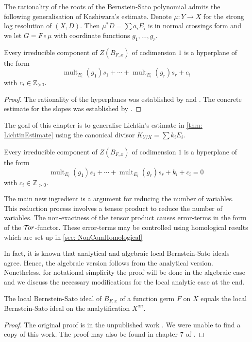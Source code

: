 The rationality of the roots of the Bernstein-Sato polynomial admits the following generalisation of Kashiwara's estimate.
Denote $\mu:Y\to X$ for the strong log resolution of $(X,D)$.
Then $\mu^*D = \sum a_i E_i$ is in normal crossings form and we let $G = F\circ \mu$ with coordinate functions $g_1,\ldots, g_r$.
\begin{theorem}\label{thm: Slopes}
  Every irreducible component of $Z(B_{F,x})$ of codimension $1$ is a hyperplane of the form
  $$\operatorname{mult}_{E_i}(g_1) s_1 + \cdots + \operatorname{mult}_{E_i}(g_r)s_r + c_i $$
  with $c_i\in \mathbb{Z}_{>0}.$
\end{theorem}
\begin{proof}
  The rationality of the hyperplanes was established by \cite{sabbah1987proximite} and \cite{gyoja1993bernstein}.
  The concrete estimate for the slopes was established by \cite{budur2019zero}.
\end{proof}

The goal of this chapter is to generalise Lichtin's estimate in \cref{thm: LichtinEstimate} using the canonical divisor $K_{Y/X} = \sum k_i E_i$.
\begin{theorem}\label{thm: EstimateBernsteinSatoZeroLocust}
  Every irreducible component of $Z(B_{F,x})$ of codimension $1$ is a hyperplane of the form
  $$\operatorname{mult}_{E_i}(g_1) s_1 + \cdots + \operatorname{mult}_{E_i}(g_r)s_r + k_i + c_i=0$$
  with $c_i \in \mathbb{Z}_{> 0 }$.
\end{theorem}
The main new ingredient is a argument for reducing the number of variables.
This reduction process involves a tensor product to reduce the number of variables.
The non-exactness of the tensor product causes error-terms in the form of the $\mathcal{T}\mkern -3mu or$-functor.
These error-terms may be controlled using homological results which are set up in \cref{sec: NonComHomological}

In fact, it is known that analytical and algebraic local Bernstein-Sato ideals agree.
Hence, the algebraic version follows from the analytical version.
Nonetheless, for notational simplicity the proof will be done in the algebraic case and we discuss the necessary modifications for the local analytic case at the end.
\begin{theorem}\label{thm: AnalyticAlgebraic}
  The local Bernstein-Sato ideal of $B_{F,x}$ of a function germ $F$ on $X$ equals the local Bernstein-Sato ideal on the analytification $X^{an}$.
\end{theorem}
\begin{proof}
  The original proof is in the unpublished work \cite{brianccon2002remarques}.
  We were unable to find a copy of this work.
  The proof may also be found in chapter 7 of \cite{MasterThesisBSLocal}.
\end{proof}
